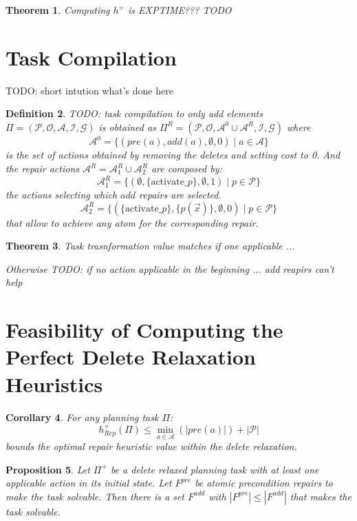 \documentclass[twocolumn]{article}
\newcommand{\task}{\ensuremath{\Pi}\xspace}
\newcommand{\preds}{\ensuremath{\mathcal{P}}\xspace}
\newcommand{\acts}{\ensuremath{\mathcal{A}}\xspace}
\newcommand{\objects}{\ensuremath{\mathcal{O}}\xspace}
\newcommand{\init}{\ensuremath{\mathcal{I}}\xspace}
\newcommand{\goal}{\ensuremath{\mathcal{G}}\xspace}
\newcommand{\someVar}{\ensuremath{x}\xspace}
\newcommand{\someAtom}{\ensuremath{p(\vec{\someVar})}\xspace}
\newcommand{\somePred}{\ensuremath{p}\xspace}
\newcommand{\prename}{\ensuremath{pre}\xspace}
\newcommand{\addname}{\ensuremath{add}\xspace}
\newcommand{\pre}[1]{\ensuremath{\prename(#1)}\xspace}
\newcommand{\add}[1]{\ensuremath{\addname(#1)}\xspace}
\newcommand{\arity}[1]{\ensuremath{|#1|}}
\newcommand{\fixPre}{\ensuremath{F^{\prename}}\xspace}
\newcommand{\fixAdd}{\ensuremath{F^{\addname}}\xspace}
\newcommand{\someAct}{\ensuremath{a}\xspace}
\newcommand{\optimalHeuristicRel}{\ensuremath{h^{+}_{Rep}}\xspace}
\newcommand{\relaxedTask}{\ensuremath{\task^{+}}\xspace}
\newtheorem{theorem}{Theorem}
\newtheorem{proposition}[theorem]{Proposition}
\newtheorem{corollary}[theorem]{Corollary}
\newtheorem{definition}[theorem]{Definition}
\begin{document}
	\begin{theorem}
		Computing $h^+$ is EXPTIME??? TODO
	\end{theorem}
	
	
	\section{Task Compilation}
	
	TODO: short intution what's done here
	
	\begin{definition}
		
		TODO: task compilation to only add elements 
		$\task = (\preds, \objects, \acts, \init, \goal)$
		is obtained as
		$\task^{R} = (\preds, \objects, \acts^0 \cup \acts^{R}, \init, \goal)$
		where 
		$$
		\acts^0 = \{
		(\pre{\someAct}, \add{\someAct}, \emptyset, 0) \mid \someAct \in \acts
		\}
		$$
		is the set of actions obtained by removing the deletes and setting cost to 0.
		And the repair actions $\acts^{R} = \acts^{R}_1 \cup \acts^{R}_2$ are composed by:
		$$
		\acts^{R}_1 = 
		\{
		(\emptyset, \{\text{activate\_}\somePred\}, \emptyset, 1) \mid \somePred \in \preds
		\}
		$$
		the actions selecting which \addname repairs are selected.
		$$
		\acts^{R}_2
		= \{
		(\{\text{activate\_}\somePred\}, \{\someAtom\}, \emptyset, 0) \mid \somePred \in \preds
		\}$$
		that allow to achieve any atom for the corresponding repair.
	\end{definition}
	
	\begin{theorem}
		Task trasnformation value matches if one applicable ...
		
		Otherwise 
		TODO: if no action applicable in the beginning ... add reapirs can't help
	\end{theorem}
	
	
	\section{Feasibility of Computing the Perfect Delete Relaxation Heuristics}
	
	
	\begin{corollary}
		For any planning task \task:
		$$\optimalHeuristicRel(\task) \leq \min_{\someAct \in \acts}(\arity{\pre{\someAct}}) + \arity{\preds}$$
		bounds the optimal repair heuristic value within the delete relaxation.
	\end{corollary}
	
	\begin{proposition}
		Let \relaxedTask be a delete relaxed planning task with at least one applicable action in its initial state.
		Let \fixPre be atomic precondition repairs to make the task solvable.
		Then there is a set \fixAdd with $\arity{\fixPre} \leq \arity{\fixAdd}$ that makes the task solvable.
	\end{proposition}
	
\end{document}
